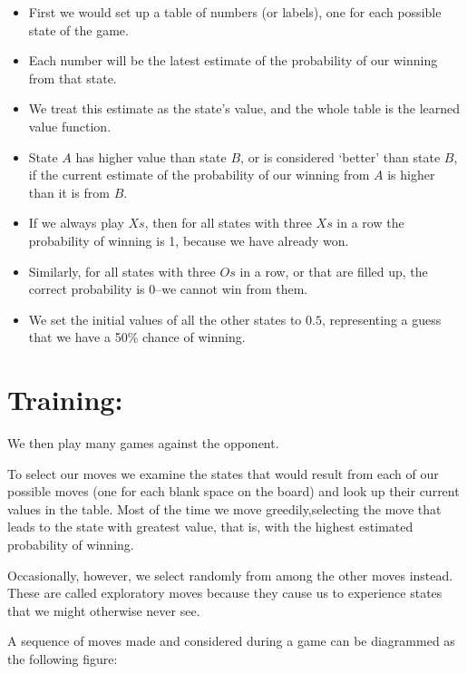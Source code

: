 \documentclass[
  letterpaper,
]{krantz}
\theoremstyle{plain}
\theoremstyle{definition}
\theoremstyle{definition}
\theoremstyle{remark}
\begin{document}

\begin{itemize}
\item
  First we would set up a table of numbers (or labels), one for each
  possible state of the game.
\item
  Each number will be the latest estimate of the probability of our
  winning from that state.
\item
  We treat this estimate as the state's value, and the whole table is
  the learned value function.
\item
  State \(A\) has higher value than state \(B\), or is considered
  `better' than state \(B\), if the current estimate of the probability
  of our winning from \(A\) is higher than it is from \(B\).
\item
  If we always play \(Xs\), then for all states with three \(Xs\) in a
  row the probability of winning is 1, because we have already won.
\item
  Similarly, for all states with three \(Os\) in a row, or that are
  filled up, the correct probability is 0--we cannot win from them.
\item
  We set the initial values of all the other states to \(0.5\),
  representing a guess that we have a 50\% chance of winning.
\end{itemize}

\section*{Training:}\label{training}


We then play many games against the opponent.

To select our moves we examine the states that would result from each of
our possible moves (one for each blank space on the board) and look up
their current values in the table. Most of the time we move
greedily,selecting the move that leads to the state with greatest value,
that is, with the highest estimated probability of winning.

Occasionally, however, we select randomly from among the other moves
instead. These are called exploratory moves because they cause us to
experience states that we might otherwise never see.

A sequence of moves made and considered during a game can be diagrammed
as the following figure:
\end{document}
